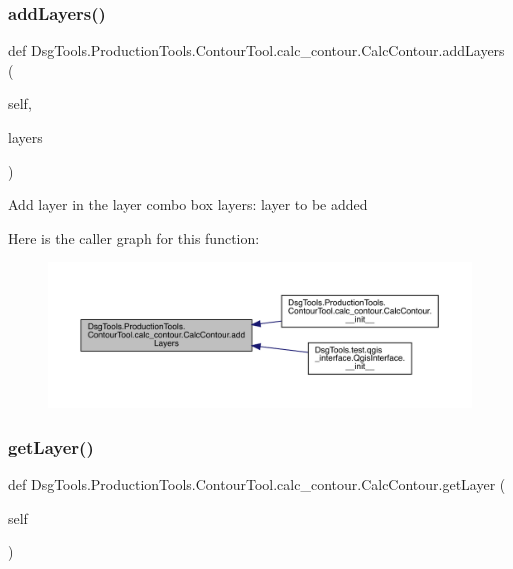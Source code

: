 \subsubsection{\texorpdfstring{add\+Layers()}{addLayers()}}
{\footnotesize\ttfamily def Dsg\+Tools.\+Production\+Tools.\+Contour\+Tool.\+calc\+\_\+contour.\+Calc\+Contour.\+add\+Layers (\begin{DoxyParamCaption}\item[{}]{self,  }\item[{}]{layers }\end{DoxyParamCaption})}

\begin{DoxyVerb}Add layer in the layer combo box
layers: layer to be added
\end{DoxyVerb}
 Here is the caller graph for this function\+:
\nopagebreak
\begin{figure}[H]
\begin{center}
\leavevmode
\includegraphics[width=350pt]{class_dsg_tools_1_1_production_tools_1_1_contour_tool_1_1calc__contour_1_1_calc_contour_ab51fb1608dce6909d4bf61e78f9e4eaf_icgraph}
\end{center}
\end{figure}
\mbox{\label{class_dsg_tools_1_1_production_tools_1_1_contour_tool_1_1calc__contour_1_1_calc_contour_a729fae5b49ceff8bf835c26ac2eae84e}} 
\subsubsection{\texorpdfstring{get\+Layer()}{getLayer()}}
{\footnotesize\ttfamily def Dsg\+Tools.\+Production\+Tools.\+Contour\+Tool.\+calc\+\_\+contour.\+Calc\+Contour.\+get\+Layer (\begin{DoxyParamCaption}\item[{}]{self }\end{DoxyParamCaption})}

